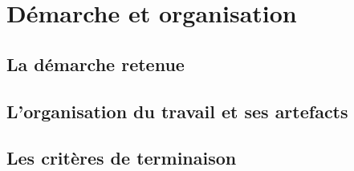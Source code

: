 
\chapter{Démarche et organisation}

\section{La démarche retenue}

\section{L'organisation du travail et ses artefacts}

\section{Les critères de terminaison}
